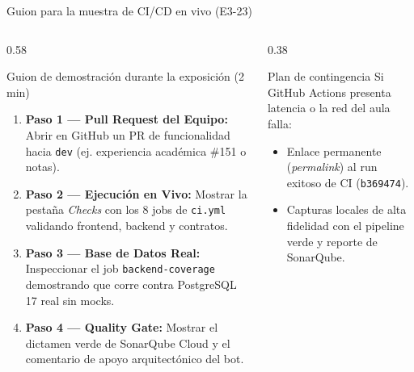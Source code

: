 \begin{frame}{Guion para la muestra de CI/CD en vivo (E3-23)}
\begin{columns}[T,onlytextwidth]
\begin{column}{0.58\textwidth}
\begin{block}{Guion de demostración durante la exposición (2 min)}
\scriptsize
\begin{enumerate}
  \item \textbf{Paso 1 — Pull Request del Equipo:} Abrir en GitHub un PR de funcionalidad hacia \texttt{dev} (ej. experiencia académica \#151 o notas).
  \item \textbf{Paso 2 — Ejecución en Vivo:} Mostrar la pestaña \textit{Checks} con los 8 jobs de \texttt{ci.yml} validando frontend, backend y contratos.
  \item \textbf{Paso 3 — Base de Datos Real:} Inspeccionar el job \texttt{backend-coverage} demostrando que corre contra PostgreSQL 17 real sin mocks.
  \item \textbf{Paso 4 — Quality Gate:} Mostrar el dictamen verde de SonarQube Cloud y el comentario de apoyo arquitectónico del bot.
\end{enumerate}
\end{block}
\end{column}
\begin{column}{0.38\textwidth}
\begin{block}{Plan de contingencia}
\scriptsize
Si GitHub Actions presenta latencia o la red del aula falla:
\begin{itemize}
  \item Enlace permanente (\textit{permalink}) al run exitoso de CI (\texttt{b369474}).
  \item Capturas locales de alta fidelidad con el pipeline verde y reporte de SonarQube.
\end{itemize}
\end{block}
\end{column}
\end{columns}
\end{frame}

